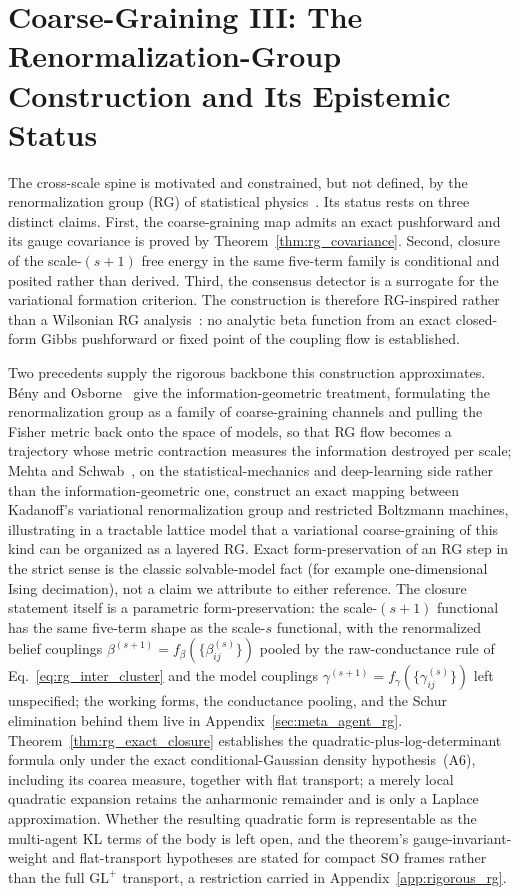 \documentclass[11pt]{article}
\begin{document}
\section{Coarse-Graining III: The Renormalization-Group Construction and Its Epistemic Status}\label{sec:rg_status}

The cross-scale spine is motivated and constrained, but not defined, by the renormalization group (RG) of statistical physics~\cite{Wilson1971, Cardy1996}. Its status rests on three distinct claims. First, the coarse-graining map admits an exact pushforward and its gauge covariance is proved by Theorem~\ref{thm:rg_covariance}. Second, closure of the scale-$(s+1)$ free energy in the same five-term family is conditional and posited rather than derived. Third, the consensus detector is a surrogate for the variational formation criterion. The construction is therefore RG-inspired rather than a Wilsonian RG analysis~\cite{Wilson1974}: no analytic beta function from an exact closed-form Gibbs pushforward or fixed point of the coupling flow is established.

Two precedents supply the rigorous backbone this construction approximates. B\'eny and Osborne~\cite{beny2015information} give the information-geometric treatment, formulating the renormalization group as a family of coarse-graining channels and pulling the Fisher metric back onto the space of models, so that RG flow becomes a trajectory whose metric contraction measures the information destroyed per scale; Mehta and Schwab~\cite{mehta2014exact}, on the statistical-mechanics and deep-learning side rather than the information-geometric one, construct an exact mapping between Kadanoff's variational renormalization group and restricted Boltzmann machines, illustrating in a tractable lattice model that a variational coarse-graining of this kind can be organized as a layered RG. Exact form-preservation of an RG step in the strict sense is the classic solvable-model fact (for example one-dimensional Ising decimation), not a claim we attribute to either reference. The closure statement itself is a parametric form-preservation: the scale-$(s+1)$ functional has the same five-term shape as the scale-$s$ functional, with the renormalized belief couplings $\beta^{(s+1)} = f_\beta(\{\beta_{ij}^{(s)}\})$ pooled by the raw-conductance rule of Eq.~\eqref{eq:rg_inter_cluster} and the model couplings $\gamma^{(s+1)} = f_\gamma(\{\gamma_{ij}^{(s)}\})$ left unspecified; the working forms, the conductance pooling, and the Schur elimination behind them live in Appendix~\ref{sec:meta_agent_rg}. Theorem~\ref{thm:rg_exact_closure} establishes the quadratic-plus-log-determinant formula only under the exact conditional-Gaussian density hypothesis~(A6), including its coarea measure, together with flat transport; a merely local quadratic expansion retains the anharmonic remainder and is only a Laplace approximation. Whether the resulting quadratic form is representable as the multi-agent KL terms of the body is left open, and the theorem's gauge-invariant-weight and flat-transport hypotheses are stated for compact $\mathrm{SO}$ frames rather than the full $\mathrm{GL}^+$ transport, a restriction carried in Appendix~\ref{app:rigorous_rg}.
\end{document}
